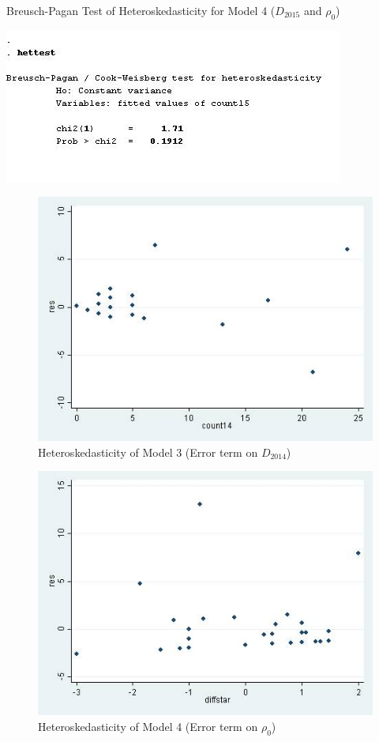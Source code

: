 \documentclass[Journal,letterpaper, NoLineNumbers]{ascelike-new}
\begin{document}
\begin{table}
\centering
\caption{Breusch-Pagan Test of Heteroskedasticity for Model 4 ($D_{2015}$ and $\rho_0$)}

\includegraphics[]{BPTestLearning.png}

\end{table}

\begin{figure}
\caption{Heteroskedasticity of Model 3 (Error term on $D_{2014}$)}
\centering

\includegraphics[]{heteroskedasticity_graph.png}
\end{figure}

\begin{figure}
\caption{Heteroskedasticity of Model 4 (Error term on $\rho_0$)}
\centering

\includegraphics[]{HeteroGraphLearning.png}
\end{figure}
\end{document}
